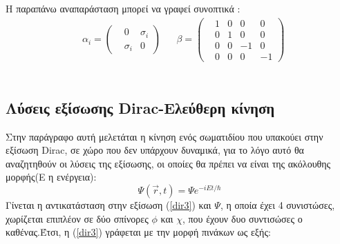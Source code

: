 Η παραπάνω αναπαράσταση μπορεί να γραφεί συνοπτικά : \\
\begin{align*}
  &\alpha_i =
  \begin{pmatrix}
    &0 &\sigma_i \\
    &\sigma_i &0 
  \end{pmatrix}
  & &\beta=
  \begin{pmatrix}
    &1 &0 &0 &0\\
    &0 &1 &0 &0\\
    &0 &0 &-1 &0\\
    &0 &0 &0 &-1
  \end{pmatrix}
\end{align*}\\ 
\pagebreak
\subsection{Λύσεις εξίσωσης \textlatin{Dirac}-Ελεύθερη κίνηση}
Στην παράγραφο αυτή μελετάται η κίνηση ενός σωματιδίου που υπακούει στην εξίσωση \textlatin{Dirac}, σε χώρο που δεν υπάρχουν δυναμικά, για το λόγο αυτό θα αναζητηθούν οι λύσεις της εξίσωσης, οι οποίες θα πρέπει να είναι της ακόλουθης μορφής(Ε η ενέργεια): 
\[ 
\Psi(\vec{r},t)=\Psi e^{-iEt/\hbar} 
\]
Γίνεται η αντικατάσταση στην εξίσωση (\ref{dir3}) και $\Psi$, η οποία έχει 4 συνιστώσες,  χωρίζεται επιπλέον σε δύο σπίνορες $\phi$ και $\chi$, που έχουν δυο συντισώσες ο καθένας.Έτσι, η  (\ref{dir3}) γράφεται με την μορφή πινάκων ως εξής: 

